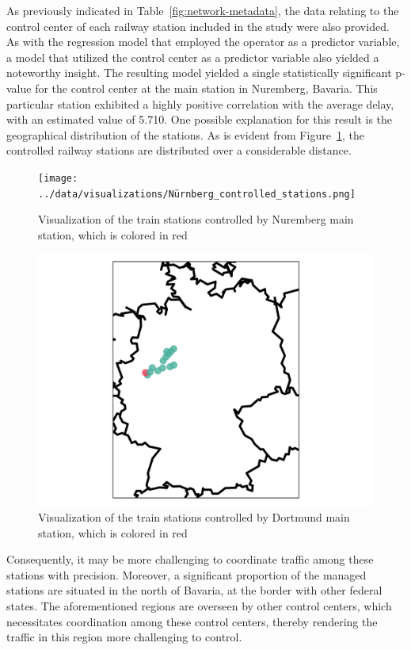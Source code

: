 \documentclass[12pt,a4paper]{article}
\begin{document}
As previously indicated in Table~\ref{fig:network-metadata}, the data relating to the control center of each railway station included in the study were also provided.
As with the regression model that employed the operator as a predictor variable, a model that utilized the control center as a predictor variable also yielded a noteworthy insight.
The resulting model yielded a single statistically significant p-value for the control center at the main station in Nuremberg, Bavaria.
This particular station exhibited a highly positive correlation with the average delay, with an estimated value of 5.710. 
One possible explanation for this result is the geographical distribution of the stations.
As is evident from Figure~\ref{fig:nb-control}, the controlled railway stations are distributed over a considerable distance. 

\begin{figure}[h]
  \texttt{[image: ../data/visualizations/Nürnberg\_controlled\_stations.png]}
  \caption{Visualization of the train stations controlled by Nuremberg main station, which is colored in red}
   \label{fig:nb-control}
\end{figure}

\begin{figure}[h]
  \includegraphics[clip=true,width=\columnwidth]{../data/visualizations/Dortmund_controlled_stations.png}
  \caption{Visualization of the train stations controlled by Dortmund main station, which is colored in red}
   \label{fig:do-control}
\end{figure}

Consequently, it may be more challenging to coordinate traffic among these stations with precision. 
Moreover, a significant proportion of the managed stations are situated in the north of Bavaria, at the border with other federal states. 
The aforementioned regions are overseen by other control centers, which necessitates coordination among these control centers, thereby rendering the traffic in this region more challenging to control.
\end{document}
